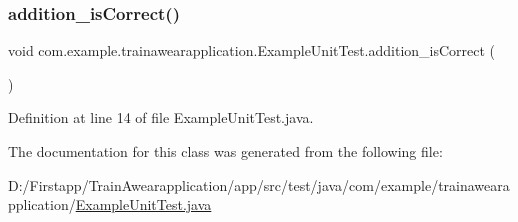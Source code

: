 \subsubsection{\texorpdfstring{addition\_isCorrect()}{addition\_isCorrect()}}
{\footnotesize\ttfamily void com.\+example.\+trainawearapplication.\+Example\+Unit\+Test.\+addition\+\_\+is\+Correct (\begin{DoxyParamCaption}{ }\end{DoxyParamCaption})\hspace{0.3cm}{\ttfamily [inline]}}



Definition at line 14 of file Example\+Unit\+Test.\+java.


\begin{DoxyCode}{0}

\end{DoxyCode}


The documentation for this class was generated from the following file\+:\begin{DoxyCompactItemize}
\item 
D\+:/\+Firstapp/\+Train\+Awearapplication/app/src/test/java/com/example/trainawearapplication/\mbox{\hyperlink{_example_unit_test_8java}{Example\+Unit\+Test.\+java}}\end{DoxyCompactItemize}
